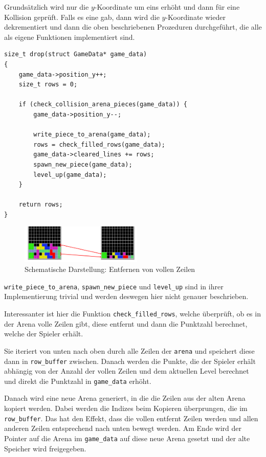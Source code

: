 \documentclass[11pt]{article}
\newcommand{\lstin}[1]{\lstinline[language=C]{#1}}
\begin{document}
Grundsätzlich wird nur die $y$-Koordinate um eins erhöht und dann für eine Kollision geprüft.
Falls es eine gab, dann wird die $y$-Koordinate wieder dekrementiert und dann die oben beschriebenen Prozeduren durchgeführt, die alle als eigene Funktionen implementiert sind. 

\begin{lstlisting}
size_t drop(struct GameData* game_data)
{
    game_data->position_y++;
    size_t rows = 0;

    if (check_collision_arena_pieces(game_data)) {
        game_data->position_y--;

        write_piece_to_arena(game_data);
        rows = check_filled_rows(game_data);
        game_data->cleared_lines += rows;
        spawn_new_piece(game_data);
        level_up(game_data);
    }

    return rows;
}
\end{lstlisting}
\vspace{10pt}

\begin{figure}
  \includegraphics[width=220px]{../images/arena_copy.png}
  \caption{Schematische Darstellung: Entfernen von vollen Zeilen}
\end{figure}

\lstin{write_piece_to_arena}, \lstin{spawn_new_piece} und \lstin{level_up} sind in ihrer Implementierung trivial und werden deswegen hier nicht genauer beschrieben.


Interessanter ist hier die Funktion \lstin{check_filled_rows}, welche überprüft, ob es in der Arena volle Zeilen gibt, diese entfernt und dann die Punktzahl berechnet, welche der Spieler erhält. 

Sie iteriert von unten nach oben durch alle Zeilen der \lstin{arena} und speichert diese dann in \lstin{row_buffer} zwischen.
Danach werden die Punkte, die der Spieler erhält abhängig von der Anzahl der vollen Zeilen und dem aktuellen Level berechnet und direkt die Punktzahl in \lstin{game_data} erhöht.

Danach wird eine neue Arena generiert, in die die Zeilen aus der alten Arena kopiert werden. 
Dabei werden die Indizes beim Kopieren überprungen, die im \lstin{row_buffer}. Das hat den Effekt, 
dass die vollen entfernt Zeilen werden und allen anderen Zeilen entsprechend nach unten bewegt werden.
Am Ende wird der Pointer auf die Arena im \lstin{game_data} auf diese neue Arena gesetzt und der alte Speicher wird freigegeben.
\end{document}
